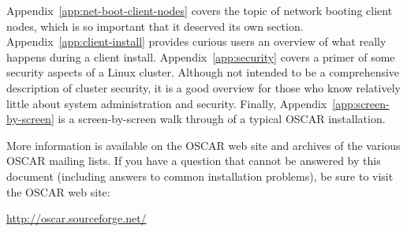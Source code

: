 Appendix~\ref{app:net-boot-client-nodes} covers the topic of network
booting client nodes, which is so important that it deserved its own
section.  
%
Appendix~\ref{app:client-install} provides curious users an overview
of what really happens during a client install.
%
Appendix~\ref{app:security} covers a primer of some security aspects
of a Linux cluster.  Although not intended to be a comprehensive
description of cluster security, it is a good overview for those who
know relatively little about system administration and security.
%
Finally, Appendix~\ref{app:screen-by-screen} is a screen-by-screen
walk through of a typical OSCAR installation.

More information is available on the OSCAR web site and archives of
the various OSCAR mailing lists.  If you have a question that cannot
be answered by this document (including answers to common installation
problems), be sure to visit the OSCAR web site:

\vspace{11pt}
\centerline{\url{http://oscar.sourceforge.net/}}

